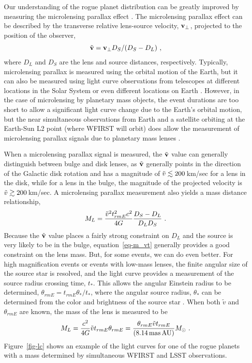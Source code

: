 Our understanding of the rogue planet distribution can be greatly improved
by measuring the microlensing parallax effect \citep{1992ApJ...392..442G,1995ApJ...454L.125A}. 
The microlensing parallax effect can be described
by the transverse relative lens-source velocity, ${\bf v}_{\rm \perp}$, projected
to the position of the observer,
\begin{equation}
\tilde{\bf v} = {\bf v}_{\rm \perp} D_S/(D_S-D_L) \ , \label{eq-vp}
\end{equation}
where $D_L$ and $D_S$ are the lens and source distances, respectively.
Typically, microlensing parallax
is measured using the orbital motion of the Earth, but it can also be
measured using light curve observations from telescopes at different locations
in the Solar System \citep{2007ApJ...664..862D,2015ApJ...804...20C} or
even different locations on Earth \citep{2009ApJ...698L.147G}. However, in the
case of microlensing by planetary mass objects, the event durations are
too short to allow a significant light curve change due to the Earth's
orbital motion, but the near simultaneous observations from Earth and a
satellite orbiting at the Earth-Sun L2 point (where WFIRST will orbit) does
allow the measurement of microlensing parallax signals due to planetary mass
lenses \citep{2003ApJ...591L..53G}.

When a microlensing parallax signal is measured, the $\tilde{\bf v}$ value
can generally distinguish between bulge and disk lenses, as $\tilde{\bf v}$
generally points in the direction of the Galactic disk rotation and has
a magnitude of $\tilde{v} \lesssim 200\,$km/sec for a lens in the
disk, while for a lens in the bulge, the magnitude of the projected velocity
is $\tilde{v} \gtrsim 200\,$km/sec. A microlensing parallax measurement also
yields a mass distance relationship,
\begin{equation}
   M_L = {\tilde{v}^2 t_{rm E}^2 c^2 \over 4 G} {D_S-D_L \over D_L D_S} \ .
   \label{eq-m_vt}
\end{equation}
Because the $\tilde{\bf v}$ value places a fairly strong constraint
on $D_L$ and the source is very likely to be in the bulge, equation~\ref{eq-m_vt}
generally provides a good constraint on the lens mass. But, for some
events, we can do even better. For high magnification events or events
with low-mass lenses, the finite angular size of the source star is
resolved, and the light curve provides a measurement of the source
radius crossing time, $t_*$. This allows the angular Einstein radius
to be determined, $\theta_{rm E} = t_{rm E} \theta_*/t_*$, where the angular
source radius, $\theta_*$ can be determined from the color and brightness
of the source star \citep{2014AJ....147...47B}. When both $\tilde{v}$ and
$\theta_{rm E}$ are known, the mass of the lens is measured to be
\begin{equation}
M_L = {c^2\over 4G} \tilde{v} t_{rm E} \theta_{rm E} = {\theta_{rm E}\tilde{v} t_{rm E} \over (8.14\,{\rm mas\, AU})} M_{\odot} \ .
\label{eq-m}
\end{equation}
Figure~\ref{fig-lc} shows an example of the light curves for one of the
rogue planets with a mass determined by simultaneous WFIRST and LSST
observations.

